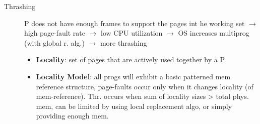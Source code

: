 \begin{description}
    \item[Thrashing] P does not have enough frames to support the pages int he working set $\rightarrow$ high page-fault rate $\rightarrow$ low CPU utilization $\rightarrow$ OS increases multiprog (with global r. alg.) $\rightarrow$ more thrashing
    \begin{itemize}
        \item \textbf{Locality}: set of pages that are actively used together by a P.
        \item \textbf{Locality Model}: all progs will exhibit a basic patterned mem reference structure, page-faults occur only when it changes locality (of mem-reference). Thr. occurs when sum of locality sizes > total phys. mem, can be limited by using local replacement algo, or simply providing enough mem.
    \end{itemize} %
\end{description}
